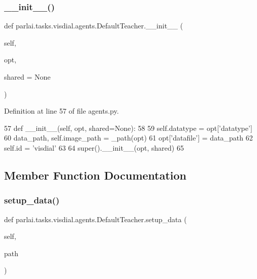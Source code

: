 \subsubsection{\texorpdfstring{\+\_\+\+\_\+init\+\_\+\+\_\+()}{\_\_init\_\_()}}
{\footnotesize\ttfamily def parlai.\+tasks.\+visdial.\+agents.\+Default\+Teacher.\+\_\+\+\_\+init\+\_\+\+\_\+ (\begin{DoxyParamCaption}\item[{}]{self,  }\item[{}]{opt,  }\item[{}]{shared = {\ttfamily None} }\end{DoxyParamCaption})}



Definition at line 57 of file agents.\+py.


\begin{DoxyCode}
57     \textcolor{keyword}{def }\_\_init\_\_(self, opt, shared=None):
58 
59         self.datatype = opt[\textcolor{stringliteral}{'datatype'}]
60         data\_path, self.image\_path = \_path(opt)
61         opt[\textcolor{stringliteral}{'datafile'}] = data\_path
62         self.id = \textcolor{stringliteral}{'visdial'}
63 
64         super().\_\_init\_\_(opt, shared)
65 
\end{DoxyCode}


\subsection{Member Function Documentation}
\mbox{\label{classparlai_1_1tasks_1_1visdial_1_1agents_1_1DefaultTeacher_a73a89661d069778cbdb3b71ec0ea72f0}} 
\subsubsection{\texorpdfstring{setup\+\_\+data()}{setup\_data()}}
{\footnotesize\ttfamily def parlai.\+tasks.\+visdial.\+agents.\+Default\+Teacher.\+setup\+\_\+data (\begin{DoxyParamCaption}\item[{}]{self,  }\item[{}]{path }\end{DoxyParamCaption})}



